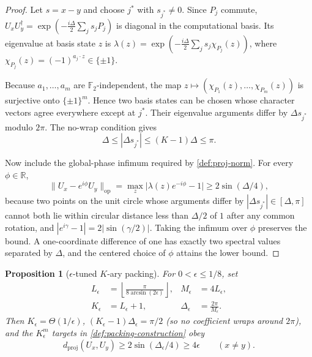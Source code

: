 \documentclass[aps,prx,reprint,floatfix,superscriptaddress]{revtex4-2}
\newtheorem{proposition}{Proposition}
\newcommand{\Ftwo}{\mathbb{F}_2}
\begin{document}
\begin{proof}
Let $s=x-y$ and choose $j^*$ with $s_{j^*}\neq0$.
Since $P_j$ commute, $U_x U_y^\dagger = \exp(-\frac{i\Delta}{2}\sum_j s_j P_j)$
is diagonal in the computational basis. Its eigenvalue at basis state $z$ is
$\lambda(z) = \exp(-\frac{i\Delta}{2}\sum_j s_j \chi_{P_j}(z))$,
where $\chi_{P_j}(z) = (-1)^{a_j \cdot z} \in \{\pm 1\}$.

Because $a_1,\ldots,a_m$ are $\Ftwo$-independent, the map
$z \mapsto (\chi_{P_1}(z),\ldots,\chi_{P_m}(z))$ is surjective onto
$\{\pm 1\}^m$. Hence two basis states can be chosen whose character
vectors agree everywhere except at $j^*$.  Their eigenvalue arguments
differ by $\Delta s_{j^*}$ modulo $2\pi$.  The no-wrap condition gives
\begin{equation*}
 \Delta\leq |\Delta s_{j^*}|\leq(K-1)\Delta\leq\pi .
\end{equation*}

Now include the global-phase infimum required by
\cref{def:proj-norm}. For every $\phi \in \mathbb{R}$,
\begin{equation}\label{eq:packing-sep-norm}
\|U_x - e^{i\phi} U_y\|_{\mathrm{op}}
 = \max_z \bigl|\lambda(z)e^{-i\phi} - 1\bigr|
 \geq 2\sin(\Delta/4),
\end{equation}
because two points on the unit circle whose arguments differ by
$|\Delta s_{j^*}|\in[\Delta,\pi]$ cannot both lie within circular distance
less than $\Delta/2$ of $1$ after any common rotation, and
$|e^{i\gamma} - 1| = 2|\sin(\gamma/2)|$. Taking the infimum over $\phi$
preserves the bound. A one-coordinate difference of one has exactly two
spectral values separated by $\Delta$, and the centered choice of $\phi$
attains the lower bound.
\end{proof}

\begin{proposition}[$\epsilon$-tuned $K$-ary packing]
\label{prop:epsilon-packing}
For $0<\epsilon\leq1/8$, set
\begin{equation}\label{eq:epsilon-codebook}
\begin{aligned}
 L_\epsilon&=\left\lfloor
  \frac{\pi}{8\arcsin(2\epsilon)}\right\rfloor,&
 M_\epsilon&=4L_\epsilon,\\
 K_\epsilon&=L_\epsilon+1,&
 \Delta_\epsilon&=\frac{2\pi}{M_\epsilon}.
\end{aligned}
\end{equation}
Then $K_\epsilon=\Theta(1/\epsilon)$,
$(K_\epsilon-1)\Delta_\epsilon=\pi/2$ (so no coefficient wraps around
$2\pi$), and the $K_\epsilon^m$ targets in
\cref{def:packing-construction} obey
\begin{equation}\label{eq:epsilon-separation}
 d_{\mathrm{proj}}(U_x,U_y)
 \geq2\sin(\Delta_\epsilon/4)\geq4\epsilon
 \qquad(x\neq y).
\end{equation}
\end{proposition}
\end{document}
